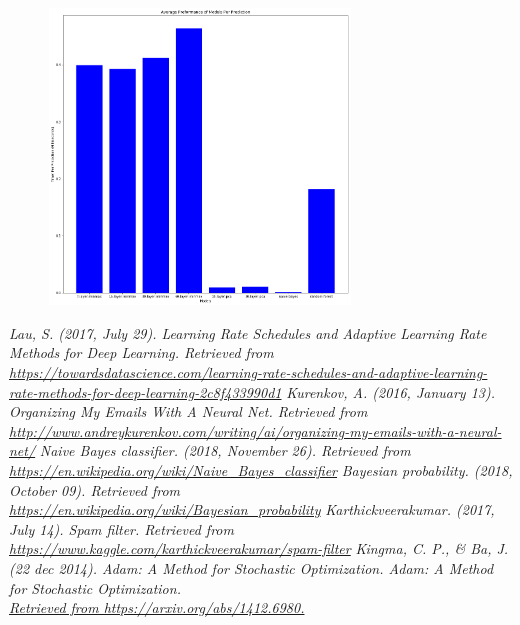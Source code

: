\documentclass[a4paper,11pt]{article}
\begin{document}
\begin{figure}[H]
\centering
\includegraphics[width=8cm]{Preformance}
\caption{}
\label{fig-7}
\end{figure}

\begin{thebibliography}{9}
\textit{Lau, S. (2017, July 29). Learning Rate Schedules and Adaptive Learning Rate Methods for Deep Learning. Retrieved from 
\\{\tiny\url{https://towardsdatascience.com/learning-rate-schedules-and-adaptive-learning-rate-methods-for-deep-learning-2c8f433990d1}}}
\textit{Kurenkov, A. (2016, January 13). Organizing My Emails With A Neural Net. Retrieved from \\
{\tiny\url{http://www.andreykurenkov.com/writing/ai/organizing-my-emails-with-a-neural-net/}}}
\textit{Naive Bayes classifier. (2018, November 26). Retrieved from \\
{\tiny\url{https://en.wikipedia.org/wiki/Naive_Bayes_classifier}}}
\textit{Bayesian probability. (2018, October 09). Retrieved from \\
{\tiny\url{https://en.wikipedia.org/wiki/Bayesian_probability}}}
\textit{Karthickveerakumar. (2017, July 14). Spam filter. Retrieved from\\
{\tiny\url{ https://www.kaggle.com/karthickveerakumar/spam-filter}}}
\textit{Kingma, C. P., \& Ba, J. (22 dec 2014). Adam: A Method for Stochastic Optimization. Adam: A Method for Stochastic Optimization.\\
{\tiny\url{ Retrieved from https://arxiv.org/abs/1412.6980.}}}

\end{thebibliography}
\end{document}

